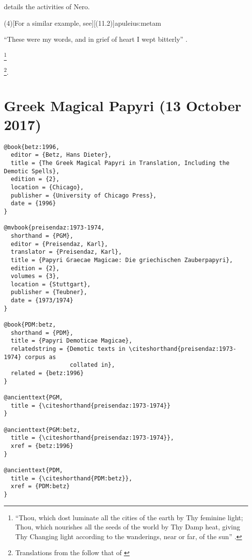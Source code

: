 \documentclass[a4paper]{article}
\begin{document}
\begin{verbcite}
  \cite[(15)]{tacitus:ann} details the activities of Nero.
\end{verbcite}
\examplecite(4)[For a similar example, see][(11.2)]{apuleius:metam}
\begin{verbcite}
  “These were my words, and in grief of heart I wept bitterly”
  .
\end{verbcite}
\begin{fverbcite}{4}
  \footnote{“Thou, which dost luminate all the cities of the earth by Thy
    feminine light; Thou, which nourishes all the seeds of the world by Thy
    Damp heat, giving Thy Changing light according to the wanderings, near or
    far, of the sun” .}
\end{fverbcite}
\begin{fverbcite}{3}
  \footnote{Translations from the  follow that of
    \cite{apuleius:golden}}.
\end{fverbcite}
\begin{verbcite}
  \nocite{aristotle:metaphysics:2, augustine:cityofgod:1,
    aristotle:metaphysics, augustine:cityofgod, augustine:selectletters,
    aristotle:poetics, longinus:sublime, demetrius:style}
\end{verbcite}
\nocite{aristotle:poetics:book:short}
\exampleancientsources
\examplesecondarysources
\examplebibliography
{}

\section{Greek Magical Papyri (13 October 2017)}

\begin{verbatim}
@book{betz:1996,
  editor = {Betz, Hans Dieter},
  title = {The Greek Magical Papyri in Translation, Including the Demotic Spells},
  edition = {2},
  location = {Chicago},
  publisher = {University of Chicago Press},
  date = {1996}
}

@mvbook{preisendaz:1973-1974,
  shorthand = {PGM},
  editor = {Preisendaz, Karl},
  translator = {Preisendaz, Karl},
  title = {Papyri Graecae Magicae: Die griechischen Zauberpapyri},
  edition = {2},
  volumes = {3},
  location = {Stuttgart},
  publisher = {Teubner},
  date = {1973/1974}
}

@book{PDM:betz,
  shorthand = {PDM},
  title = {Papyri Demoticae Magicae},
  relatedstring = {Demotic texts in \citeshorthand{preisendaz:1973-1974} corpus as
                   collated in},
  related = {betz:1996}
}

@ancienttext{PGM,
  title = {\citeshorthand{preisendaz:1973-1974}}
}

@ancienttext{PGM:betz,
  title = {\citeshorthand{preisendaz:1973-1974}},
  xref = {betz:1996}
}

@ancienttext{PDM,
  title = {\citeshorthand{PDM:betz}},
  xref = {PDM:betz}
}
\end{verbatim}
\end{document}
